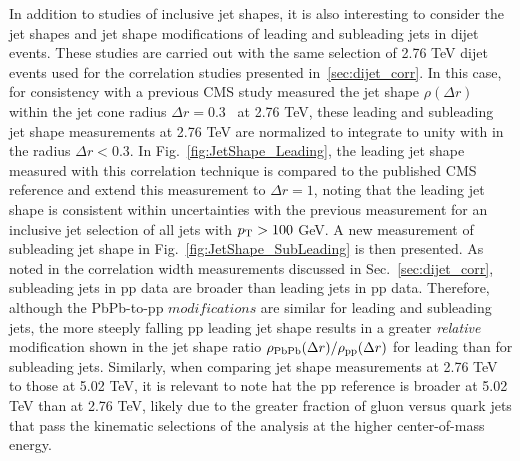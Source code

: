 In addition to studies of inclusive jet shapes, it is also interesting to consider the jet shapes and jet shape modifications of leading and subleading jets in dijet events.  These studies are carried out with the same selection of 2.76 TeV dijet events used for the correlation studies presented in~\ref{sec:dijet_corr}.  In this case, for consistency with a previous CMS study measured the jet shape $\rho(\Delta r)$ within the jet cone radius $\Delta r = 0.3$~\cite{Chatrchyan:2013kwa} at 2.76 TeV, these leading and subleading jet shape measurements at 2.76 TeV are normalized to integrate to unity with in the radius $\Delta r < 0.3$.  In Fig.~\ref{fig:JetShape_Leading}, the leading jet shape measured with this correlation technique is compared to the published CMS reference and extend this measurement to $\Delta r = 1$, noting that the leading jet shape is consistent within uncertainties with the previous measurement for an inclusive jet selection of all jets with $p_{\rm T}>100$ GeV.  A new measurement of subleading jet shape in Fig.~\ref{fig:JetShape_SubLeading} is then presented.  As noted in the correlation width measurements discussed in Sec.~\ref{sec:dijet_corr}, subleading jets in pp data are broader than leading jets in pp data.  Therefore, although the PbPb-to-pp $modifications$ are similar for leading and subleading jets, the more steeply falling pp leading jet shape results in a greater \textit{relative} modification shown in the jet shape ratio $\rho_{\rm PbPb}(\Delta r)/\rho_{\rm pp}(\Delta r)$ for leading than for subleading jets.  Similarly, when comparing jet shape measurements at 2.76 TeV to those at 5.02 TeV, it is relevant to note hat the pp reference is broader at 5.02 TeV than at 2.76 TeV, likely due to the greater fraction of gluon versus quark jets that pass the kinematic selections of the analysis at the higher center-of-mass energy.  


